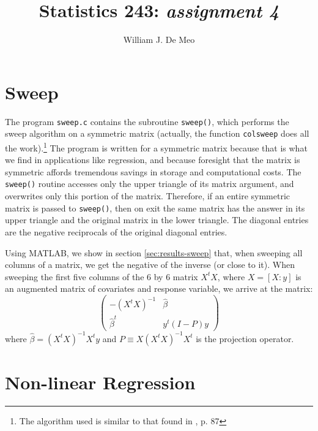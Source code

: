 \documentclass{article}
\begin{document}
\title{Statistics 243: \emph{assignment 4}}
\author{William J. De Meo}
\maketitle
\section{Sweep}
The program {\tt sweep.c} contains the subroutine {\tt sweep()},
which performs the sweep algorithm on a symmetric matrix
(actually, the function {\tt colsweep} does all the work).\footnote{The algorithm
used is similar to that found in \cite{thisted}, p. 87}  The program 
is written for a symmetric matrix because that is what we find in 
applications like regression, and because foresight that the
matrix is symmetric affords tremendous savings in storage and
computational costs.  The {\tt sweep()} routine
accesses only the upper triangle of its matrix argument, and
overwrites only this portion of the matrix.  Therefore, if an
entire symmetric matrix is passed to {\tt sweep()}, then on exit
the same matrix has the answer in its upper triangle and the original
matrix in the lower triangle.  The diagonal entries are the negative
reciprocals of the original diagonal entries.  

Using MATLAB, we show in section \ref{sec:results-sweep} that, 
when sweeping all columns of a matrix, we get the negative of the
inverse (or close to it).  When sweeping the first five columns of
the 6 by 6 matrix $X^tX$, where $X = [X:y]$ is an augmented matrix
of covariates and response variable, we arrive at the matrix:
\[\left(\begin{array}{cc}
-(X^tX)^{-1} & \hat \beta \\
\hat \beta^t & y^t(I-P)y \end{array}\right)\]
where $\hat \beta = (X^tX)^{-1}X^ty$ and $ P \equiv X(X^tX)^{-1}X^t$ 
is the projection operator.  

\section{Non-linear Regression}
\label{sec:theory-nls}
\end{document}
